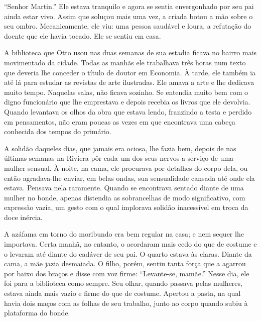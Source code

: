 ``Senhor Martin.'' Ele estava tranquilo e agora se sentia envergonhado
por seu pai ainda estar vivo. Assim que soluçou mais uma vez, a criada
botou a mão sobre o seu ombro. Mecanicamente, ele viu: uma pessoa
saudável e loura, a refutação do doente que ele havia tocado. Ele se
sentiu em casa.

A biblioteca que Otto usou nas duas semanas de sua estadia ficava no
bairro mais movimentado da cidade. Todas as manhãs ele trabalhava três
horas num texto que deveria lhe conceder o título de doutor em Economia.
À tarde, ele também ia até lá para estudar as revistas de arte
ilustradas. Ele amava a arte e lhe dedicava muito tempo. Naquelas salas,
não ficava sozinho. Se entendia muito bem com o digno funcionário que
lhe emprestava e depois recebia os livros que ele devolvia. Quando
levantava os olhos da obra que estava lendo, franzindo a testa e perdido
em pensamentos, não eram poucas as vezes em que encontrava uma cabeça
conhecida dos tempos do primário.

A solidão daqueles dias, que jamais era ociosa, lhe fazia bem, depois de
nas últimas semanas na Riviera pôr cada um dos seus nervos a serviço de
uma mulher sensual. À noite, na cama, ele procurava por detalhes do
corpo dela, ou então agradava-lhe enviar, em belas ondas, sua
sensualidade cansada até onde ela estava. Pensava nela raramente. Quando
se encontrava sentado diante de uma mulher no bonde, apenas distendia as
sobrancelhas de modo significativo, com expressão vazia, um gesto com o
qual implorava solidão inacessível em troca da doce inércia.

A azáfama em torno do moribundo era bem regular na casa; e nem sequer
lhe importava. Certa manhã, no entanto, o acordaram mais cedo do que de
costume e o levaram até diante do cadáver de seu pai. O quarto estava às
claras. Diante da cama, a mãe jazia desmaiada. O filho, porém, sentiu
tanta força que a agarrou por baixo dos braços e disse com voz firme:
``Levante-se, mamãe.'' Nesse dia, ele foi para a biblioteca como sempre.
Seu olhar, quando passava pelas mulheres, estava ainda mais vazio e
firme do que de costume. Apertou a pasta, na qual havia dois maços com
as folhas de seu trabalho, junto ao corpo quando subiu à plataforma do
bonde.

